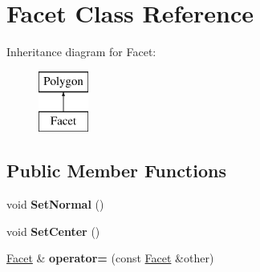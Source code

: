 \hypertarget{class_facet}{}\section{Facet Class Reference}
\label{class_facet}
Inheritance diagram for Facet\+:\begin{figure}[H]
\begin{center}
\leavevmode
\includegraphics[height=2.000000cm]{class_facet}
\end{center}
\end{figure}
\subsection*{Public Member Functions}
\begin{DoxyCompactItemize}
\item 
\mbox{\label{class_facet_a0d3733ac4cb080adb891d61aa53e99a0}} 
void {\bfseries Set\+Normal} ()
\item 
\mbox{\label{class_facet_a6d79392e22bf04c6569b9a1933f5ca3d}} 
void {\bfseries Set\+Center} ()
\item 
\mbox{\label{class_facet_a212a6d0725dcc1102901f4b46153ede2}} 
\mbox{\hyperlink{class_facet}{Facet}} \& {\bfseries operator=} (const \mbox{\hyperlink{class_facet}{Facet}} \&other)
\end{DoxyCompactItemize}
